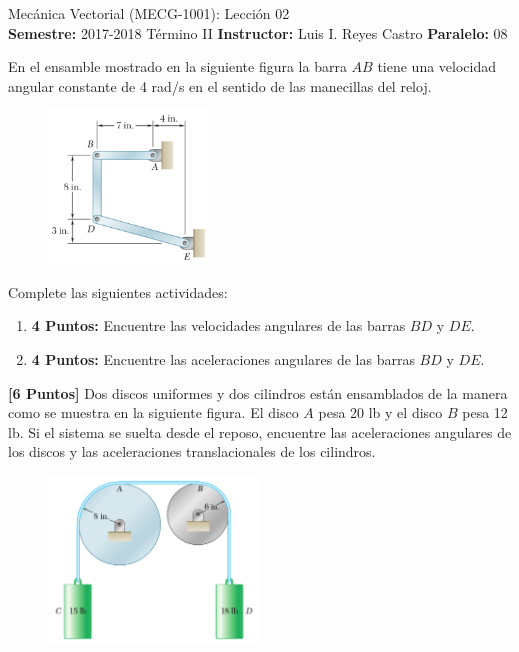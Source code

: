 \documentclass[ a4paper, twoside, 11pt]{article}
\newcommand{\numero}{02}
\begin{document}
\allowdisplaybreaks

\begin{center}
\Large Mec\'anica Vectorial (MECG-1001): Lecci\'on \numero \\[2ex]
\small \textbf{Semestre:} 2017-2018 T\'ermino II \qquad
\textbf{Instructor:} Luis I. Reyes Castro \qquad
\textbf{Paralelo:} 08
\end{center}
\fullskip

\begin{problem}
En el ensamble mostrado en la siguiente figura la barra $AB$ tiene una velocidad angular constante de 4 rad/s en el sentido de las manecillas del reloj. 

\begin{figure}[htb]
\centering
\includegraphics[width=0.38\textwidth]{problema-01.jpg}
\end{figure}

Complete las siguientes actividades: 
\begin{enumerate}[label=\textbf{\alph*)}]
\item \textbf{4 Puntos:} Encuentre las velocidades angulares de las barras $BD$ y $DE$. 
\item \textbf{4 Puntos:} Encuentre las aceleraciones angulares de las barras $BD$ y $DE$. 
\end{enumerate}

\end{problem}
\fullskip

\begin{problem}
\textbf{[6 Puntos]} Dos discos uniformes y dos cilindros est\'an ensamblados de la manera como se muestra en la siguiente figura. El disco $A$ pesa 20 lb y el disco $B$ pesa 12 lb. Si el sistema se suelta desde el reposo, encuentre las aceleraciones angulares de los discos y las aceleraciones translacionales de los cilindros. 

\begin{figure}[htb]
\centering
\includegraphics[width=0.50\textwidth]{problema-02.jpg}
\end{figure}

\end{problem}
\fullskip
\end{document}
